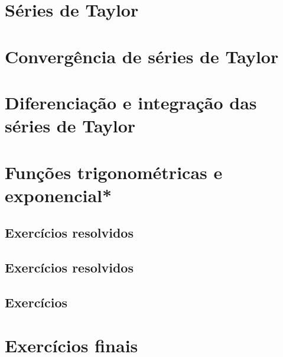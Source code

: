 \section{Séries de Taylor}
\section{Convergência de séries de Taylor}
\section{Diferenciação e integração das séries de Taylor}
\section{Funções trigonométricas e exponencial*}


\construirSec

\subsection*{Exercícios resolvidos}

\construirExeresol


\subsection*{Exercícios resolvidos}

\construirExeresol


\subsection*{Exercícios}

\construirExer

\section{Exercícios finais}

\construirExer



